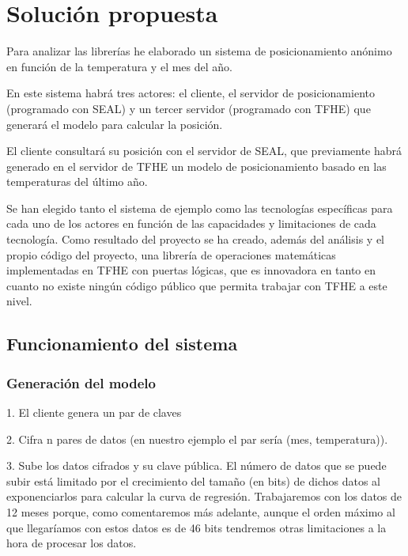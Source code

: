 \chapter{Solución propuesta}

Para analizar las librerías he elaborado un sistema de posicionamiento anónimo en función de la temperatura y el mes del año.

En este sistema habrá tres actores: el cliente, el servidor de posicionamiento (programado con SEAL) y un tercer servidor (programado con TFHE) que generará el modelo para calcular la posición.

El cliente consultará su posición con el servidor de SEAL, que previamente habrá generado en el servidor de TFHE un modelo de posicionamiento basado en las temperaturas del último año.

Se han elegido tanto el sistema de ejemplo como las tecnologías específicas para cada uno de los actores en función de las capacidades y limitaciones de cada tecnología. Como resultado del proyecto se ha creado, además del análisis y el propio código del proyecto, una librería de operaciones matemáticas implementadas en TFHE\cite{tfhe-math} con puertas lógicas, que es innovadora en tanto en cuanto no existe ningún código público que permita trabajar con TFHE a este nivel.


\section{Funcionamiento del sistema}


\subsection{Generación del modelo}

1. El cliente genera un par de claves

2. Cifra n pares de datos (en nuestro ejemplo el par sería (mes, temperatura)).

3. Sube los datos cifrados y su clave pública. El número de datos que se puede subir está limitado por el crecimiento del tamaño (en bits) de dichos datos al exponenciarlos para calcular la curva de regresión. Trabajaremos con los datos de 12 meses porque, como comentaremos más adelante, aunque el orden máximo al que llegaríamos con estos datos es de 46 bits tendremos otras limitaciones a la hora de procesar los datos.

